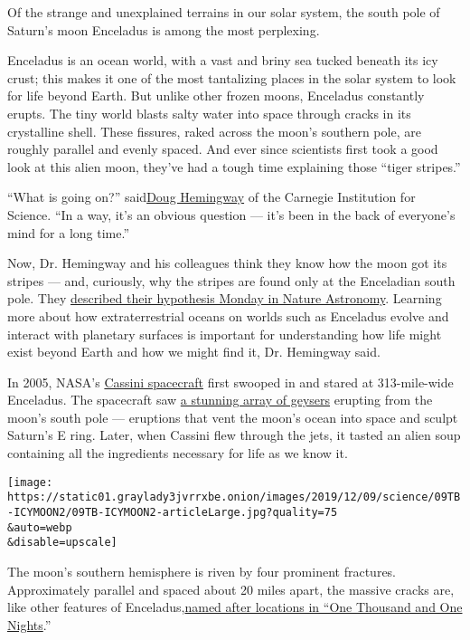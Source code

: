 Of the strange and unexplained terrains in our solar system, the south
pole of Saturn's moon Enceladus is among the most perplexing.

Enceladus is an ocean world, with a vast and briny sea tucked beneath
its icy crust; this makes it one of the most tantalizing places in the
solar system to look for life beyond Earth. But unlike other frozen
moons, Enceladus constantly erupts. The tiny world blasts salty water
into space through cracks in its crystalline shell. These fissures,
raked across the moon's southern pole, are roughly parallel and evenly
spaced. And ever since scientists first took a good look at this alien
moon, they've had a tough time explaining those ``tiger stripes.''

``What is going on?''
said\href{https://dtm.carnegiescience.edu/people/postdoctoral/doug-hemingway}{Doug
Hemingway} of the Carnegie Institution for Science. ``In a way, it's an
obvious question --- it's been in the back of everyone's mind for a long
time.''

Now, Dr. Hemingway and his colleagues think they know how the moon got
its stripes --- and, curiously, why the stripes are found only at the
Enceladian south pole. They
\href{https://www.nature.com/articles/s41550-019-0958-x}{described their
hypothesis Monday in Nature Astronomy}. Learning more about how
extraterrestrial oceans on worlds such as Enceladus evolve and interact
with planetary surfaces is important for understanding how life might
exist beyond Earth and how we might find it, Dr. Hemingway said.

In 2005, NASA's
\href{https://www.nytimes3xbfgragh.onion/interactive/2017/09/14/science/cassini-saturn-images.html}{Cassini
spacecraft} first swooped in and stared at 313-mile-wide Enceladus. The
spacecraft saw
\href{https://www.nytimes3xbfgragh.onion/2015/10/29/science/space/in-icy-breath-of-saturns-moon-enceladus-cassini-hunts-for-life.html}{a
stunning array of geysers} erupting from the moon's south pole ---
eruptions that vent the moon's ocean into space and sculpt Saturn's E
ring. Later, when Cassini flew through the jets, it tasted an alien soup
containing all the ingredients necessary for life as we know it.

\texttt{[image: https://static01.graylady3jvrrxbe.onion/images/2019/12/09/science/09TB-ICYMOON2/09TB-ICYMOON2-articleLarge.jpg?quality=75\\\&auto=webp\\\&disable=upscale]}

The moon's southern hemisphere is riven by four prominent fractures.
Approximately parallel and spaced about 20 miles apart, the massive
cracks are, like other features of
Enceladus,\href{https://planetarynames.wr.usgs.gov/Page/Categories}{named
after locations in ``One Thousand and One Nights}.''

